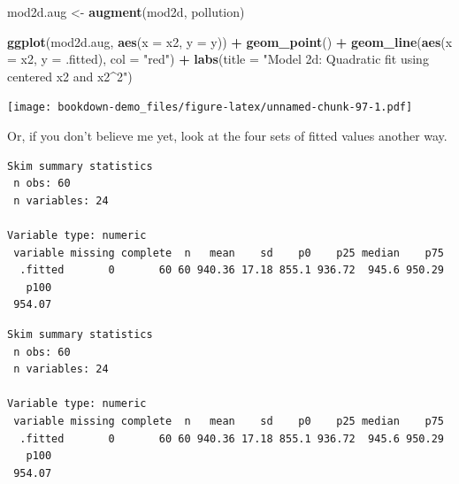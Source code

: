 \documentclass[]{book}
\newenvironment{Shaded}{\begin{snugshade}}{\end{snugshade}}
\newcommand{\KeywordTok}[1]{\textcolor[rgb]{0.13,0.29,0.53}{\textbf{#1}}}
\newcommand{\DataTypeTok}[1]{\textcolor[rgb]{0.13,0.29,0.53}{#1}}
\newcommand{\StringTok}[1]{\textcolor[rgb]{0.31,0.60,0.02}{#1}}
\newcommand{\OperatorTok}[1]{\textcolor[rgb]{0.81,0.36,0.00}{\textbf{#1}}}
\newcommand{\NormalTok}[1]{#1}
\theoremstyle{definition}
\theoremstyle{definition}
\theoremstyle{definition}
\theoremstyle{remark}
\begin{document}
\begin{Shaded}
\begin{Highlighting}[]
\NormalTok{mod2d.aug <-}\StringTok{ }\KeywordTok{augment}\NormalTok{(mod2d, pollution)}

\KeywordTok{ggplot}\NormalTok{(mod2d.aug, }\KeywordTok{aes}\NormalTok{(}\DataTypeTok{x =}\NormalTok{ x2, }\DataTypeTok{y =}\NormalTok{ y)) }\OperatorTok{+}
\StringTok{    }\KeywordTok{geom_point}\NormalTok{() }\OperatorTok{+}
\StringTok{    }\KeywordTok{geom_line}\NormalTok{(}\KeywordTok{aes}\NormalTok{(}\DataTypeTok{x =}\NormalTok{ x2, }\DataTypeTok{y =}\NormalTok{ .fitted), }\DataTypeTok{col =} \StringTok{"red"}\NormalTok{) }\OperatorTok{+}
\StringTok{    }\KeywordTok{labs}\NormalTok{(}\DataTypeTok{title =} \StringTok{"Model 2d: Quadratic fit using centered x2 and x2^2"}\NormalTok{)}
\end{Highlighting}
\end{Shaded}

\texttt{[image: bookdown-demo\_files/figure-latex/unnamed-chunk-97-1.pdf]}

Or, if you don't believe me yet, look at the four sets of fitted values
another way.

\begin{Shaded}
\end{Shaded}

\begin{verbatim}
Skim summary statistics
 n obs: 60 
 n variables: 24 

Variable type: numeric 
 variable missing complete  n   mean    sd    p0    p25 median    p75
  .fitted       0       60 60 940.36 17.18 855.1 936.72  945.6 950.29
   p100
 954.07
\end{verbatim}

\begin{Shaded}
\end{Shaded}

\begin{verbatim}
Skim summary statistics
 n obs: 60 
 n variables: 24 

Variable type: numeric 
 variable missing complete  n   mean    sd    p0    p25 median    p75
  .fitted       0       60 60 940.36 17.18 855.1 936.72  945.6 950.29
   p100
 954.07
\end{verbatim}
\end{document}
